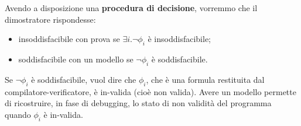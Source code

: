 Avendo a disposizione una \textbf{procedura di decisione}, vorremmo che il dimostratore rispondesse:
\begin{itemize}
	\item insoddisfacibile con prova se $\exists i. \neg\phi_i$ è insoddisfacibile;
	\item soddisfacibile con un modello se $\neg\phi_i$ è soddisfacibile.
\end{itemize}

Se $\neg\phi_i$ è soddisfacibile, vuol dire che $\phi_i$, che è una formula restituita dal compilatore-verificatore, è in-valida (cioè non valida). Avere un modello permette di ricostruire, in fase di debugging, lo stato di non validità del programma quando $\phi_i$ è in-valida.
